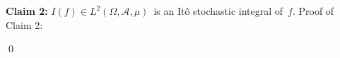 \begin{enumerate}
	\vskip 0.3cm
	\textbf{Claim 2:}\quad
	$I(f) \in L^{2}(\Omega,\mathcal{A},\mu)$\, is an It\^{o} stochastic integral of \,$f$.
	\vskip 0.2cm
	\noindent
	Proof of Claim 2:\quad
	
\end{enumerate}
\qed

